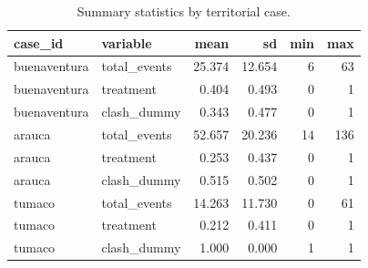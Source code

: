 \begin{table}

\caption{\label{tab:summary_by_case}Summary statistics by territorial case.}
\centering
\begin{tabular}[t]{llrrrr}
\toprule
case\_id & variable & mean & sd & min & max\\
\midrule
buenaventura & total\_events & 25.374 & 12.654 & 6 & 63\\
buenaventura & treatment & 0.404 & 0.493 & 0 & 1\\
buenaventura & clash\_dummy & 0.343 & 0.477 & 0 & 1\\
arauca & total\_events & 52.657 & 20.236 & 14 & 136\\
arauca & treatment & 0.253 & 0.437 & 0 & 1\\
\addlinespace
arauca & clash\_dummy & 0.515 & 0.502 & 0 & 1\\
tumaco & total\_events & 14.263 & 11.730 & 0 & 61\\
tumaco & treatment & 0.212 & 0.411 & 0 & 1\\
tumaco & clash\_dummy & 1.000 & 0.000 & 1 & 1\\
\bottomrule
\end{tabular}
\end{table}
